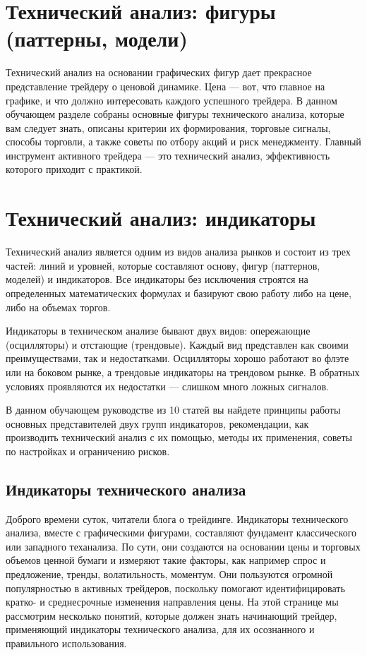 \documentclass[a5paper]{article}
\begin{document}
\section{Технический анализ: фигуры (паттерны, модели)}

Технический анализ на основании графических фигур дает прекрасное
представление трейдеру о ценовой динамике. Цена — вот, что главное на
графике, и что должно интересовать каждого успешного трейдера. В
данном обучающем разделе собраны основные фигуры технического анализа,
которые вам следует знать, описаны критерии их формирования, торговые
сигналы, способы торговли, а также советы по отбору акций и риск
менеджменту. Главный инструмент активного трейдера — это технический
анализ, эффективность которого приходит с практикой.


\section{Технический анализ: индикаторы}

Технический анализ является одним из видов анализа рынков и состоит из трех частей: линий и уровней, которые составляют основу, фигур (паттернов, моделей) и индикаторов. Все индикаторы без исключения строятся на определенных математических формулах и базируют свою работу либо на цене, либо на объемах торгов.

Индикаторы в техническом анализе бывают двух видов: опережающие (осцилляторы) и отстающие (трендовые). Каждый вид представлен как своими преимуществами, так и недостатками. Осцилляторы хорошо работают во флэте или на боковом рынке, а трендовые индикаторы на трендовом рынке. В обратных условиях проявляются их недостатки — слишком много ложных сигналов.

В данном обучающем руководстве из 10 статей вы найдете принципы работы
основных представителей двух групп индикаторов, рекомендации, как
производить технический анализ с их помощью, методы их применения,
советы по настройках и ограничению рисков.

\subsection{Индикаторы технического анализа}

Доброго времени суток, читатели блога о трейдинге. Индикаторы
технического анализа, вместе с графическими фигурами, составляют
фундамент классического или западного теханализа. По сути, они
создаются на основании цены и торговых объемов ценной бумаги и
измеряют такие факторы, как например спрос и предложение, тренды,
волатильность, моментум. Они пользуются огромной популярностью в
активных трейдеров, поскольку помогают идентифицировать кратко- и
среднесрочные изменения направления цены. На этой странице мы
рассмотрим несколько понятий, которые должен знать начинающий трейдер,
применяющий индикаторы технического анализа, для их осознанного и
правильного использования.
\end{document}
